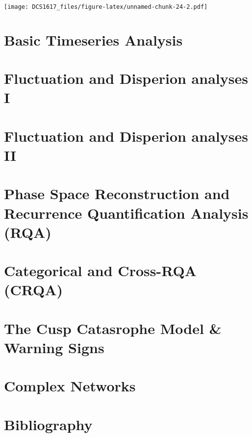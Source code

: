 \documentclass[]{book}
\begin{document}
\texttt{[image: DCS1617\_files/figure-latex/unnamed-chunk-24-2.pdf]}

\chapter{\texorpdfstring{\textbf{Basic Timeseries
Analysis}}{Basic Timeseries Analysis}}\label{btasol}

\chapter{\texorpdfstring{\textbf{Fluctuation and Disperion analyses
I}}{Fluctuation and Disperion analyses I}}\label{fda1sol}

\chapter{\texorpdfstring{\textbf{Fluctuation and Disperion analyses
II}}{Fluctuation and Disperion analyses II}}\label{fda1so2}

\chapter{\texorpdfstring{\textbf{Phase Space Reconstruction and
Recurrence Quantification Analysis
(RQA)}}{Phase Space Reconstruction and Recurrence Quantification Analysis (RQA)}}\label{RQAsol}

\chapter{\texorpdfstring{\textbf{Categorical and Cross-RQA
(CRQA)}}{Categorical and Cross-RQA (CRQA)}}\label{CRQAsol}

\chapter{\texorpdfstring{\textbf{The Cusp Catasrophe Model \& Warning
Signs}}{The Cusp Catasrophe Model \& Warning Signs}}\label{cuspsol}

\chapter{\texorpdfstring{\textbf{Complex
Networks}}{Complex Networks}}\label{netssol}

\chapter*{\texorpdfstring{\textbf{Bibliography}}{Bibliography}}\label{bibliography}


\end{document}
